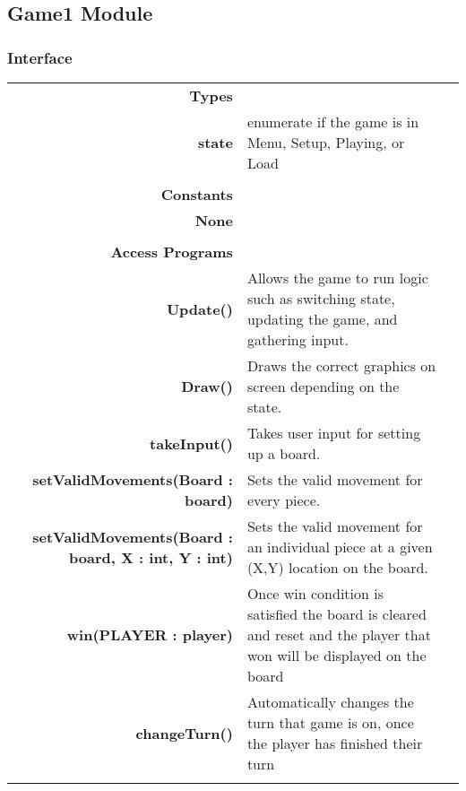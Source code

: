 \documentclass[10pt]{article}
\makeatletter
\newcommand{\CustomLabel}[1]{\Hy@raisedlink{\hypertarget{#1}{}}\label{#1}}
\makeatother
\begin{document}
    \subsection{Game1 Module}\CustomLabel{mis:Game1}
    \subsubsection{Interface}
        \begin{tabularx}{\linewidth}{@{} >{\bfseries}r Xp{5cm} }
            Types           & \begin{tabular}[t]{@{} l p{8cm}} 
                                     & \\
                                    state & enumerate if the game is in Menu, Setup, Playing, or Load \\
                              \end{tabular} \\
                              
            Constants       & \begin{tabular}[t]{@{} l p{8cm}} 
                                     & \\
                                    None & \\
                              \end{tabular} \\

            Access Programs & \begin{tabular}[t]{@{} p{4cm} p{8cm}}
                                     & \\
                                    Update() & Allows the game to run logic such as switching state, updating the game, and gathering input. \\
                                    Draw() & Draws the correct graphics on screen depending on the state. \\ 
                                    takeInput() & Takes user input for setting up a board. \\
                                    setValidMovements(Board : board) & Sets the valid movement for every piece. \\
                                    setValidMovements(Board : board, X : int, Y : int) & Sets the valid movement for an individual piece at a given (X,Y) location on the board. \\
                                    win(PLAYER : player) & Once win condition is satisfied the board is cleared and reset and the player that won will be displayed on the board \\
                                    changeTurn() & Automatically changes the turn that game is on, once the player has finished their turn\\
                              \end{tabular}
        \end{tabularx}
        
\end{document}
